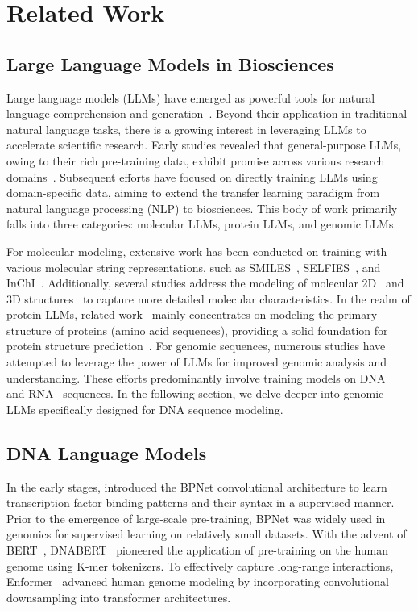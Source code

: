 \section{Related Work}

\subsection{Large Language Models in Biosciences}
Large language models (LLMs) have emerged as powerful tools for natural language comprehension and generation~\cite{llms-survey}. Beyond their application in traditional natural language tasks, there is a growing interest in leveraging LLMs to accelerate scientific research. Early studies revealed that general-purpose LLMs, owing to their rich pre-training data, exhibit promise across various research domains~\cite{ai4science}. Subsequent efforts have focused on directly training LLMs using domain-specific data, aiming to extend the transfer learning paradigm from natural language processing (NLP) to biosciences. This body of work primarily falls into three categories: molecular LLMs, protein LLMs, and genomic LLMs.

For molecular modeling, extensive work has been conducted on training with various molecular string representations, such as SMILES~\cite{Smiles-bert,space-of-chemical,large-scale-chemical}, SELFIES~\cite{SELFIES,chemberta,chemberta2}, and InChI~\cite{inchi}. Additionally, several studies address the modeling of molecular 2D~\cite{mol-2d} and 3D structures~\cite{uni-mol} to capture more detailed molecular characteristics. In the realm of protein LLMs, related work~\cite{msa-transformer,esm2,Prottrans} mainly concentrates on modeling the primary structure of proteins (amino acid sequences), providing a solid foundation for protein structure prediction~\cite{AlphaFold2,AlphaFold3}. For genomic sequences, numerous studies have attempted to leverage the power of LLMs for improved genomic analysis and understanding. These efforts predominantly involve training models on DNA~\cite{BPNet,DNABERT,enformer,nucleotide-transformer,DNABERT-2,GROVER,gena-lm,Caduceus,dnagpt,megaDNA,HyenaDNA,Evo} and RNA~\cite{RNAErnie,uni-rna,Rinalmo} sequences. In the following section, we delve deeper into genomic LLMs specifically designed for DNA sequence modeling.

\subsection{DNA Language Models}
In the early stages, \citeauthor{BPNet} introduced the BPNet convolutional architecture to learn transcription factor binding patterns and their syntax in a supervised manner. Prior to the emergence of large-scale pre-training, BPNet was widely used in genomics for supervised learning on relatively small datasets. With the advent of BERT~\cite{BERT}, DNABERT~\cite{DNABERT} pioneered the application of pre-training on the human genome using K-mer tokenizers. To effectively capture long-range interactions, Enformer~\cite{enformer} advanced human genome modeling by incorporating convolutional downsampling into transformer architectures.

